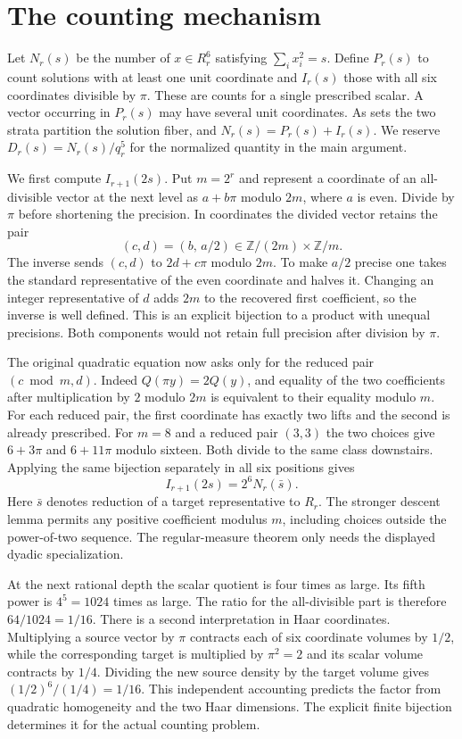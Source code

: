 \documentclass[12pt,letterpaper]{article}
\begin{document}
\section{The counting mechanism}
Let $N_r(s)$ be the number of $x\in R_r^6$ satisfying $\sum_i x_i^2=s$. Define $P_r(s)$ to count solutions with at least one unit coordinate and $I_r(s)$ those with all six coordinates divisible by $\pi$. These are counts for a single prescribed scalar. A vector occurring in $P_r(s)$ may have several unit coordinates. As sets the two strata partition the solution fiber, and $N_r(s)=P_r(s)+I_r(s)$. We reserve $D_r(s)=N_r(s)/q_r^5$ for the normalized quantity in the main argument.

We first compute $I_{r+1}(2s)$. Put $m=2^r$ and represent a coordinate of an all-divisible vector at the next level as $a+b\pi$ modulo $2m$, where $a$ is even. Divide by $\pi$ before shortening the precision. In coordinates the divided vector retains the pair
\[
   (c,d)=(b,\,a/2)\in \mathbb Z/(2m)\times\mathbb Z/m.
\]
The inverse sends $(c,d)$ to $2d+c\pi$ modulo $2m$. To make $a/2$ precise one takes the standard representative of the even coordinate and halves it. Changing an integer representative of $d$ adds $2m$ to the recovered first coefficient, so the inverse is well defined. This is an explicit bijection to a product with unequal precisions. Both components would not retain full precision after division by $\pi$.

The original quadratic equation now asks only for the reduced pair $(c\bmod m,d)$. Indeed $Q(\pi y)=2Q(y)$, and equality of the two coefficients after multiplication by $2$ modulo $2m$ is equivalent to their equality modulo $m$. For each reduced pair, the first coordinate has exactly two lifts and the second is already prescribed. For $m=8$ and a reduced pair $(3,3)$ the two choices give $6+3\pi$ and $6+11\pi$ modulo sixteen. Both divide to the same class downstairs. Applying the same bijection separately in all six positions gives
\[
                    I_{r+1}(2s)=2^6 N_r(\bar s).
\]
Here $\bar s$ denotes reduction of a target representative to $R_r$. The stronger descent lemma permits any positive coefficient modulus $m$, including choices outside the power-of-two sequence. The regular-measure theorem only needs the displayed dyadic specialization.

At the next rational depth the scalar quotient is four times as large. Its fifth power is $4^5=1024$ times as large. The ratio for the all-divisible part is therefore $64/1024=1/16$. There is a second interpretation in Haar coordinates. Multiplying a source vector by $\pi$ contracts each of six coordinate volumes by $1/2$, while the corresponding target is multiplied by $\pi^2=2$ and its scalar volume contracts by $1/4$. Dividing the new source density by the target volume gives $(1/2)^6/(1/4)=1/16$. This independent accounting predicts the factor from quadratic homogeneity and the two Haar dimensions. The explicit finite bijection determines it for the actual counting problem.
\end{document}
